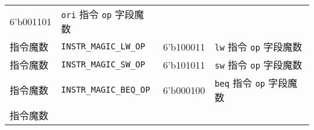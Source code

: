 \begin{longtable}[]{@{}llll@{}}
\begin{minipage}[t]{0.22\columnwidth}
6'b001101\strut
\end{minipage} & \begin{minipage}[t]{0.22\columnwidth}\raggedright
\texttt{ori} 指令 \texttt{op} 字段魔数\strut
\end{minipage}\tabularnewline
\begin{minipage}[t]{0.22\columnwidth}\raggedright
指令魔数\strut
\end{minipage} & \begin{minipage}[t]{0.22\columnwidth}\raggedright
\texttt{INSTR\_MAGIC\_LW\_OP}\strut
\end{minipage} & \begin{minipage}[t]{0.22\columnwidth}\raggedright
6'b100011\strut
\end{minipage} & \begin{minipage}[t]{0.22\columnwidth}\raggedright
\texttt{lw} 指令 \texttt{op} 字段魔数\strut
\end{minipage}\tabularnewline
\begin{minipage}[t]{0.22\columnwidth}\raggedright
指令魔数\strut
\end{minipage} & \begin{minipage}[t]{0.22\columnwidth}\raggedright
\texttt{INSTR\_MAGIC\_SW\_OP}\strut
\end{minipage} & \begin{minipage}[t]{0.22\columnwidth}\raggedright
6'b101011\strut
\end{minipage} & \begin{minipage}[t]{0.22\columnwidth}\raggedright
\texttt{sw} 指令 \texttt{op} 字段魔数\strut
\end{minipage}\tabularnewline
\begin{minipage}[t]{0.22\columnwidth}\raggedright
指令魔数\strut
\end{minipage} & \begin{minipage}[t]{0.22\columnwidth}\raggedright
\texttt{INSTR\_MAGIC\_BEQ\_OP}\strut
\end{minipage} & \begin{minipage}[t]{0.22\columnwidth}\raggedright
6'b000100\strut
\end{minipage} & \begin{minipage}[t]{0.22\columnwidth}\raggedright
\texttt{beq} 指令 \texttt{op} 字段魔数\strut
\end{minipage}\tabularnewline
\begin{minipage}[t]{0.22\columnwidth}\raggedright
指令魔数\strut
\end{minipage} & \begin{minipage}[t]{0.22\columnwidth}\raggedright

\end{minipage}
\end{longtable}
